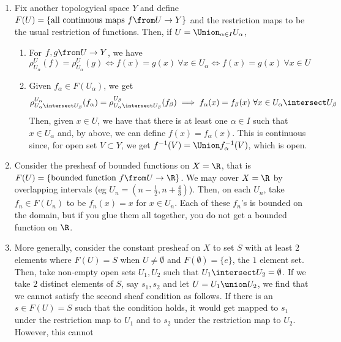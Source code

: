 \documentclass[11pt,leqno,oneside]{amsbook}
\renewcommand{\F}{F} %
\numberwithin{thm}{section}
\begin{document}
\begin{example}
  \begin{enumerate}[label=(\arabic*)]
  \item Fix another topologyical space \(Y\) and define \(\F(U) =
    \{\text{all continuous maps }f \from U \to Y\}\) and the
    restriction maps to be the usual restriction of functions. Then,
    if \(U = \Union_{\alpha \in I} U_\alpha\),
    \begin{enumerate}
    \item For \(f,g \from U \to Y\), we have \[
        \rho^U_{U_\alpha}(f) = \rho^U_{U_\alpha}(g) \iff f(x) = g(x)\ 
        \forall x \in U_\alpha \iff f(x) = g(x)\ \forall x \in U
      \]
    \item Given \(f_\alpha \in \F(U_\alpha)\), we get \[
        \rho^{U_\alpha}_{U_\alpha \intersect U_\beta}(f_\alpha) =
        \rho^{U_\beta}_{U_\alpha \intersect U_\beta}(f_\beta) \implies
        f_\alpha(x) = f_\beta(x) \ \forall x \in U_\alpha \intersect U_\beta
      \]
      Then, given \(x \in U\), we have that there is at least one
      \(\alpha \in I\) such that \(x \in U_\alpha\) and, by above, we
      can define \(f(x) = f_\alpha(x)\). This is continuous since, for
      open set \(V \subset Y\), we get \(f^{-1}(V) = \Union
      f_\alpha^{-1}(V)\), which is open. 
    \end{enumerate}
  \item Consider the presheaf of bounded functions on \(X=\R\), that
    is \(\F(U) = \{\text{bounded function }f \from U \to \R\}\). We
    may cover \(X = \R\) by overlapping intervals (eg \(U_n =
    (n-\frac{1}{2}, n+\frac{4}{3})\)). Then, on each \(U_n\), take
    \(f_n \in \F(U_n)\) to be \(f_n(x) = x\) for \(x \in U_n\). Each
    of these \(f_n\)'s is bounded on the domain, but if you glue them
    all together, you do not get a bounded function on \(\R\).
  \item More generally, consider the constant presheaf on \(X\) to set
    \(S\) with at least \(2\) elements where \(F(U) = S\) when \(U
    \neq \emptyset\) and 
    \(\F(\emptyset) = \{e\}\), the \(1\) element set. Then, take
    non-empty open sets \(U_1, U_2\) such that \(U_1 \intersect U_2 =
    \emptyset\). If we take \(2\) distinct elements of \(S\), say
    \(s_1,s_2\) and let \(U = U_1 \union U_2\), we find that we cannot
    satisfy the second sheaf condition as follows. If there
    is an \(s \in \F(U) = S\) such that the condition holds, it would
    get mapped to \(s_1\) under the restriction map to \(U_1\) and to
    \(s_2\) under the restriction map to \(U_2\). However, this cannot

\end{enumerate}
\end{example}
\end{document}

